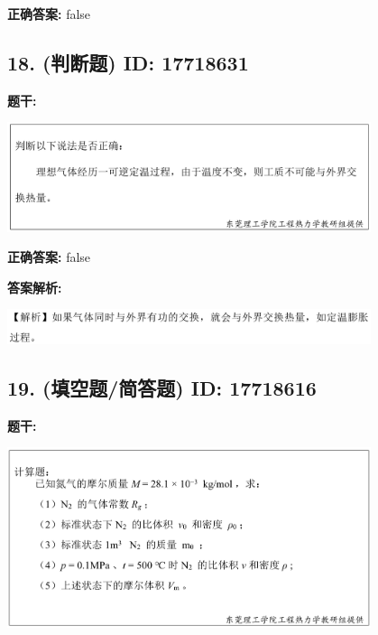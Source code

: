 \documentclass[12pt]{article}
\begin{document}
\textbf{正确答案:}
false

\vspace{0.5em}\hrulefill\vspace{1em}

\subsection*{18. (判断题) \small ID: 17718631}

\textbf{题干:}


\begin{center}\includegraphics[width=0.8\textwidth, height=0.25\textheight, keepaspectratio]{question_18_17718631/title_img_1.png}\end{center}

\textbf{正确答案:}
false

\textbf{答案解析:}


\begin{center}\includegraphics[width=0.8\textwidth, height=0.25\textheight, keepaspectratio]{question_18_17718631/correct_replay_img_1.png}\end{center}

\vspace{0.5em}\hrulefill\vspace{1em}

\subsection*{19. (填空题/简答题) \small ID: 17718616}

\textbf{题干:}


\begin{center}\includegraphics[width=0.8\textwidth, height=0.25\textheight, keepaspectratio]{question_19_17718616/title_img_1.png}\end{center}
\end{document}
